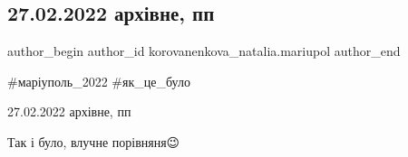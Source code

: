  
 
 
 
 

\subsection{27.02.2022 архівне, пп}
\label{sec:27_02_2023.fb.korovanenkova_natalia.mariupol.1.27_02_2022_arkh_vne_}

\ifcmt
 author_begin
   author_id korovanenkova_natalia.mariupol
 author_end
\fi

\#маріуполь\_2022 \#як\_це\_було

27.02.2022 архівне, пп

Так і було,  влучне порівняня😉
